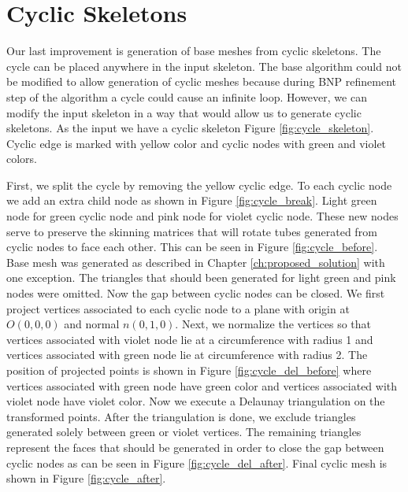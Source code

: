 \section{Cyclic Skeletons}
Our last improvement is generation of base meshes from cyclic skeletons.
The cycle can be placed anywhere in the input skeleton.
The base algorithm could not be modified to allow generation of cyclic meshes because during BNP refinement step of the algorithm a cycle could cause an infinite loop.
However, we can modify the input skeleton in a way that would allow us to generate cyclic skeletons.
As the input we have a cyclic skeleton Figure \ref{fig:cycle_skeleton}.
Cyclic edge is marked with yellow color and cyclic nodes with green and violet colors.

First, we split the cycle by removing the yellow cyclic edge.
To each cyclic node we add an extra child node as shown in Figure \ref{fig:cycle_break}.
Light green node for green cyclic node and pink node for violet cyclic node.
These new nodes serve to preserve the skinning matrices that will rotate tubes generated from cyclic nodes to face each other. This can be seen in Figure \ref{fig:cycle_before}. Base mesh was generated as described in Chapter \ref{ch:proposed_solution} with one exception.
The triangles that should been generated for light green and pink nodes were omitted.
Now the gap between cyclic nodes can be closed.
We first project vertices associated to each cyclic node to a plane with origin at $O(0, 0, 0)$ and normal $n(0, 1, 0)$.
Next, we normalize the vertices so that vertices associated with violet node lie at a circumference with radius 1 and vertices associated with green node lie at circumference with radius 2.
The position of projected points is shown in Figure \ref{fig:cycle_del_before} where vertices associated with green node have green color and vertices associated with violet node have violet color.
Now we execute a Delaunay triangulation on the transformed points.
After the triangulation is done, we exclude triangles generated solely between green or violet vertices.
The remaining triangles represent the faces that should be generated in order to close the gap between cyclic nodes as can be seen in Figure \ref{fig:cycle_del_after}.
Final cyclic mesh is shown in Figure \ref{fig:cycle_after}.

